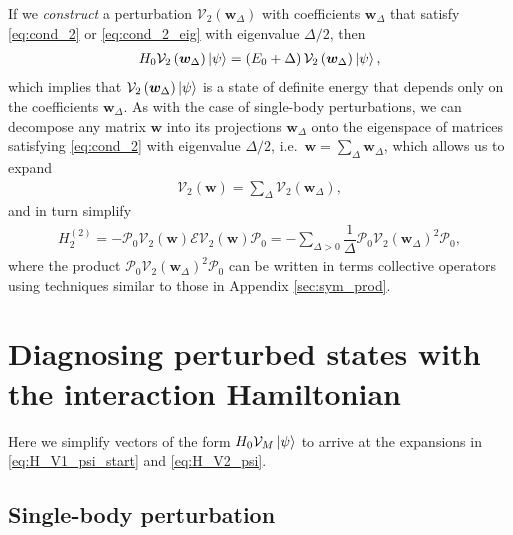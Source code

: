 \documentclass[nofootinbib,notitlepage,11pt]{revtex4-2}
\newcommand{\f}[2]{\dfrac{#1}{#2}} %
\newcommand{\p}[1]{\left(#1\right)} %
\newcommand{\m}{\bm} %
\renewcommand{\v}{\vec} %
\newcommand{\1}{\mathds{1}}
\newcommand{\E}{\mathcal{E}}
\renewcommand{\O}{\mathcal{O}}
\renewcommand{\P}{\mathcal{P}}
\newcommand{\V}{\mathcal{V}}
\begin{document}
If we {\it construct} a perturbation $\V_2\p{\m w_\Delta}$ with
coefficients $\m w_\Delta$ that satisfy \eqref{eq:cond_2} or
\eqref{eq:cond_2_eig} with eigenvalue $\Delta/2$, then
\begin{align}
  H_0 \V_2\p{\m w_\Delta} \ket\psi
  = \p{E_0 + \Delta} \V_2\p{\m w_\Delta} \ket\psi,
  \label{eq:H_V1_psi}
\end{align}
which implies that $\V_2\p{\m w_\Delta}\ket\psi$ is a state of
definite energy that depends only on the coefficients $\m w_\Delta$.
As with the case of single-body perturbations, we can decompose any
matrix $\m w$ into its projections $\m w_\Delta$ onto the eigenspace
of matrices satisfying \eqref{eq:cond_2} with eigenvalue $\Delta/2$,
i.e.~$\m w=\sum_\Delta\m w_\Delta$, which allows us to expand
\begin{align}
  \V_2\p{\m w} = \sum_\Delta \V_2\p{\m w_\Delta},
\end{align}
and in turn simplify
\begin{align}
  H_2^{(2)} = - \P_0 \V_2\p{\m w} \E \V_2\p{\m w} \P_0
  = -\sum_{\Delta>0} \f1\Delta \P_0 \V_2\p{\m w_\Delta}^2 \P_0,
\end{align}
where the product $\P_0 \V_2\p{\m w_\Delta}^2 \P_0$ can be written in
terms collective operators using techniques similar to those in
Appendix \ref{sec:sym_prod}.


\appendix

\section{Diagnosing perturbed states with the interaction Hamiltonian}

Here we simplify vectors of the form $H_0\V_M\ket\psi$ to arrive at
the expansions in \eqref{eq:H_V1_psi_start} and \eqref{eq:H_V2_psi}.

\subsection{Single-body perturbation}
\label{sec:H_V1_psi}
\end{document}
